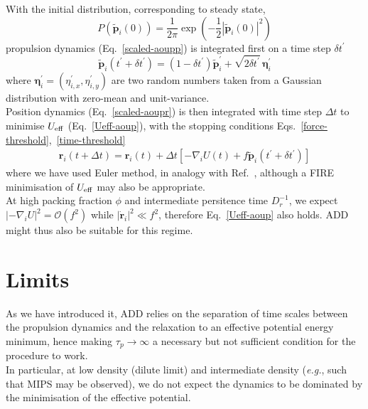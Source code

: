 \documentclass[pre,aps,superscriptaddress,longbibliography,notitlepage]{revtex4-1}
\begin{document}
With the initial distribution, corresponding to steady state,
\begin{equation}
P(\tilde{\boldsymbol{p}}_i(0)) = \frac{1}{2 \pi} \exp\left(-\frac{1}{2} |\tilde{\boldsymbol{p}}_i(0)|^2\right)
\end{equation}
propulsion dynamics (Eq.~\ref{scaled-aoupp}) is integrated first on a time step $\delta t^{\prime}$
\begin{equation}
\tilde{\boldsymbol{p}}_i(t^{\prime} + \delta t^{\prime}) = (1 - \delta t^{\prime}) \tilde{\boldsymbol{p}}_i^{\prime} + \sqrt{2 \delta t^{\prime}} \, \boldsymbol{\eta}^{\prime}_i
\end{equation}
where $\boldsymbol{\eta}^{\prime}_i = (\eta^{\prime}_{i, x}, \eta^{\prime}_{i, y})$ are two random numbers taken from a Gaussian distribution with zero-mean and unit-variance.\\

Position dynamics (Eq.~\ref{scaled-aoupr}) is then integrated with time step $\Delta t$ to minimise $U_{\rm eff}$ (Eq.~\ref{Ueff-aoup}), with the stopping conditions Eqs.~\ref{force-threshold},~\ref{time-threshold}
\begin{eqnarray}
\boldsymbol{r}_i(t + \Delta t) = \boldsymbol{r}_i(t) + \Delta t\left[-\nabla_i U(t) + f \tilde{\boldsymbol{p}}_i(t^{\prime} + \delta t^{\prime})\right]
\end{eqnarray}
where we have used Euler method, in analogy with Ref.~\cite{mandal2020study}, although a FIRE minimisation \cite{bitzek2006structural,guenole2020assessment} of $U_{\rm eff}$ may also be appropriate.\\

At high packing fraction $\phi$ and intermediate persitence time $D_r^{-1}$, we expect $|-\nabla_i U|^2 = \mathcal{O}(f^2)$ while $|\dot{\boldsymbol{r}}_i|^2 \ll f^2$, therefore Eq.~\ref{Ueff-aoup} also holds. ADD might thus also be suitable for this regime.

\section{Limits}

As we have introduced it, ADD relies on the separation of time scales between the propulsion dynamics and the relaxation to an effective potential energy minimum, hence making $\tau_p \to \infty$ a necessary but not sufficient condition for the procedure to work.\\

In particular, at low density (dilute limit) and intermediate density (\textit{e.g.}, such that MIPS may be observed), we do not expect the dynamics to be dominated by the minimisation of the effective potential.


\end{document}
